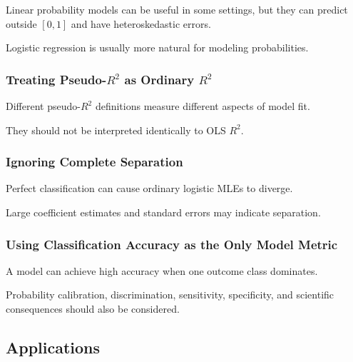 Linear probability models can be useful in some settings, but they can
predict outside \([0,1]\) and have heteroskedastic errors.

Logistic regression is usually more natural for modeling probabilities.

\subsubsection{Treating Pseudo-\(R^2\) as Ordinary \(R^2\)}

Different pseudo-\(R^2\) definitions measure different aspects of model
fit.

They should not be interpreted identically to OLS \(R^2\).

\subsubsection{Ignoring Complete Separation}

Perfect classification can cause ordinary logistic MLEs to diverge.

Large coefficient estimates and standard errors may indicate separation.

\subsubsection{Using Classification Accuracy as the Only Model Metric}

A model can achieve high accuracy when one outcome class dominates.

Probability calibration, discrimination, sensitivity, specificity, and
scientific consequences should also be considered.

\subsection{Applications}
\label{subsec:categorical-applications}

